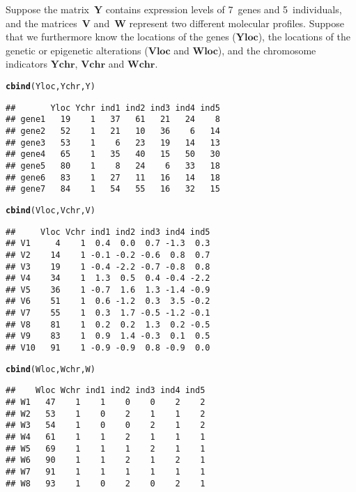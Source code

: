 \documentclass{article}\usepackage[]{graphicx}\usepackage[]{color}
\makeatletter
\newcommand{\hlstd}[1]{\textcolor[rgb]{0.345,0.345,0.345}{#1}}%
\newcommand{\hlkwd}[1]{\textcolor[rgb]{0.737,0.353,0.396}{\textbf{#1}}}%
\newenvironment{kframe}{%
 \def\at@end@of@kframe{}%
 \ifinner\ifhmode%
  \def\at@end@of@kframe{\end{minipage}}%
  \begin{minipage}{\columnwidth}%
 \fi\fi%
 \def\FrameCommand##1{\hskip\@totalleftmargin \hskip-\fboxsep
 \colorbox{shadecolor}{##1}\hskip-\fboxsep
     \hskip-\linewidth \hskip-\@totalleftmargin \hskip\columnwidth}%
 \MakeFramed {\advance\hsize-\width
   \@totalleftmargin\z@ \linewidth\hsize
   \@setminipage}}%
 {\par\unskip\endMakeFramed%
 \at@end@of@kframe}
\newenvironment{knitrout}{}{} %
\makeatother
\begin{document}
Suppose the matrix~$\boldsymbol{Y}$ contains expression levels of 7~genes and 5~individuals, and the matrices~$\boldsymbol{V}$ and~$\boldsymbol{W}$ represent two different molecular profiles. Suppose that we furthermore know the locations of the genes ($\boldsymbol{Yloc}$), the locations of the genetic or epigenetic alterations ($\boldsymbol{Vloc}$ and $\boldsymbol{Wloc}$), and the chromosome indicators $\boldsymbol{Ychr}$, $\boldsymbol{Vchr}$ and $\boldsymbol{Wchr}$.
\begin{knitrout}
\color{fgcolor}\begin{kframe}
\begin{alltt}
\hlkwd{cbind}\hlstd{(Yloc,Ychr,Y)}
\end{alltt}
\begin{verbatim}
##       Yloc Ychr ind1 ind2 ind3 ind4 ind5
## gene1   19    1   37   61   21   24    8
## gene2   52    1   21   10   36    6   14
## gene3   53    1    6   23   19   14   13
## gene4   65    1   35   40   15   50   30
## gene5   80    1    8   24    6   33   18
## gene6   83    1   27   11   16   14   18
## gene7   84    1   54   55   16   32   15
\end{verbatim}
\begin{alltt}
\hlkwd{cbind}\hlstd{(Vloc,Vchr,V)}
\end{alltt}
\begin{verbatim}
##     Vloc Vchr ind1 ind2 ind3 ind4 ind5
## V1     4    1  0.4  0.0  0.7 -1.3  0.3
## V2    14    1 -0.1 -0.2 -0.6  0.8  0.7
## V3    19    1 -0.4 -2.2 -0.7 -0.8  0.8
## V4    34    1  1.3  0.5  0.4 -0.4 -2.2
## V5    36    1 -0.7  1.6  1.3 -1.4 -0.9
## V6    51    1  0.6 -1.2  0.3  3.5 -0.2
## V7    55    1  0.3  1.7 -0.5 -1.2 -0.1
## V8    81    1  0.2  0.2  1.3  0.2 -0.5
## V9    83    1  0.9  1.4 -0.3  0.1  0.5
## V10   91    1 -0.9 -0.9  0.8 -0.9  0.0
\end{verbatim}
\begin{alltt}
\hlkwd{cbind}\hlstd{(Wloc,Wchr,W)}
\end{alltt}
\begin{verbatim}
##    Wloc Wchr ind1 ind2 ind3 ind4 ind5
## W1   47    1    1    0    0    2    2
## W2   53    1    0    2    1    1    2
## W3   54    1    0    0    2    1    2
## W4   61    1    1    2    1    1    1
## W5   69    1    1    1    2    1    1
## W6   90    1    1    2    1    2    1
## W7   91    1    1    1    1    1    1
## W8   93    1    0    2    0    2    1
\end{verbatim}
\end{kframe}
\end{knitrout}
\end{document}

